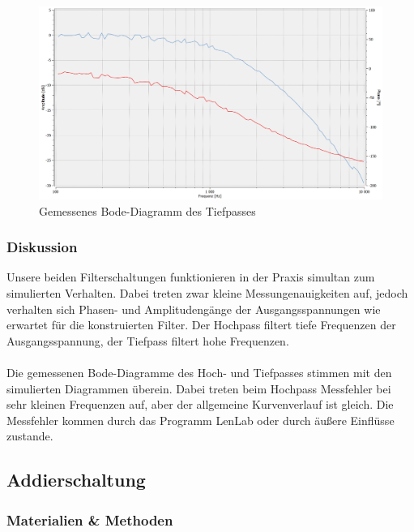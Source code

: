 \newpage

\begin{figure}[htb]
    \includegraphics[width=14cm]{./pictures/Messungen/tiefpass_Bode_Test}
    \caption{Gemessenes Bode-Diagramm des Tiefpasses}
    \label{fig:Tiefpass_Bode_Test}
\end{figure}

\subsubsection{Diskussion}

Unsere beiden Filterschaltungen funktionieren in der Praxis simultan zum simulierten Verhalten. Dabei treten zwar kleine Messungenauigkeiten auf, jedoch verhalten sich Phasen- und Amplitudengänge der Ausgangsspannungen wie erwartet für die konstruierten Filter. Der Hochpass filtert tiefe Frequenzen der Ausgangsspannung, der Tiefpass filtert hohe Frequenzen. 
\\
\\
Die gemessenen Bode-Diagramme des Hoch- und Tiefpasses stimmen mit den simulierten Diagrammen überein. Dabei treten beim Hochpass Messfehler bei sehr kleinen Frequenzen auf, aber der allgemeine Kurvenverlauf ist gleich. Die Messfehler kommen durch das Programm LenLab oder durch äußere Einflüsse zustande.

\newpage
\subsection{Addierschaltung}

\subsubsection{Materialien \& Methoden}

